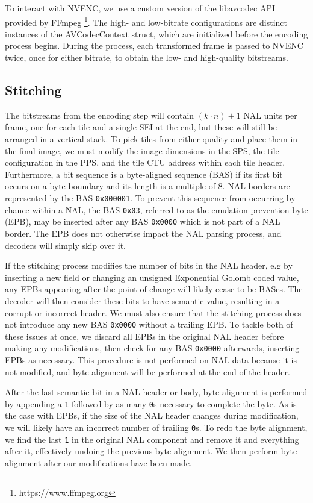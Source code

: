 To interact with NVENC, we use a custom version of the libavcodec API provided by FFmpeg \footnote{https://www.ffmpeg.org}. The high- and low-bitrate configurations are distinct instances of the AVCodecContext struct, which are initialized before the encoding process begins. During the process, each transformed frame is passed to NVENC twice, once for either bitrate, to obtain the low- and high-quality bitstreams.

\subsection{Stitching}

The bitstreams from the encoding step will contain $(k \cdot n)+1$ NAL units per frame, one for each tile and a single SEI at the end, but these will still be arranged in a vertical stack. To pick tiles from either quality and place them in the final image, we must modify the image dimensions in the SPS, the tile configuration in the PPS, and the tile CTU address within each tile header. Furthermore, a bit sequence is a byte-aligned sequence (BAS) if its first bit occurs on a byte boundary and its length is a multiple of 8. NAL borders are represented by the BAS \texttt{0x000001}. To prevent this sequence from occurring by chance within a NAL, the BAS \texttt{0x03}, referred to as the emulation prevention byte (EPB), may be inserted after any BAS \texttt{0x0000} which is not part of a NAL border. The EPB does not otherwise impact the NAL parsing process, and decoders will simply skip over it.

If the stitching process modifies the number of bits in the NAL header, e.g by inserting a new field or changing an unsigned Exponential Golomb coded value, any EPBs appearing after the point of change will likely cease to be BASes. The decoder will then consider these bits to have semantic value, resulting in a corrupt or incorrect header. We must also ensure that the stitching process does not introduce any new BAS \texttt{0x0000} without a trailing EPB. To tackle both of these issues at once, we discard all EPBs in the original NAL header before making any modifications, then check for any BAS \texttt{0x0000} afterwards, inserting EPBs as necessary. This procedure is not performed on NAL data because it is not modified, and byte alignment will be performed at the end of the header.

After the last semantic bit in a NAL header or body, byte alignment is performed by appending a \texttt{1} followed by as many \texttt{0}s necessary to complete the byte. As is the case with EPBs, if the size of the NAL header changes during modification, we will likely have an incorrect number of trailing \texttt{0}s. To redo the byte alignment, we find the last \texttt{1} in the original NAL component and remove it and everything after it, effectively undoing the previous byte alignment. We then perform byte alignment after our modifications have been made.

